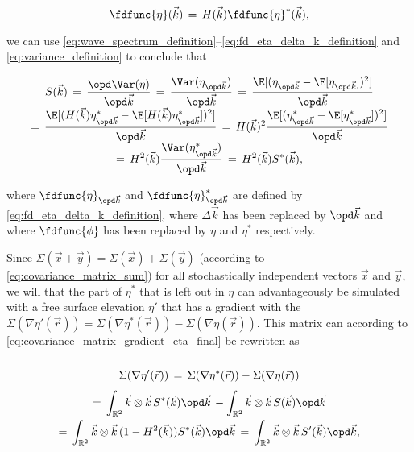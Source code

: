 {\begin{equation}
\fdfunc{\eta}(\vec{k}) \,=\, H(\vec{k})\fdfunc{\eta}^*(\vec{k}),
\end{equation}

we can use  \ref{eq:wave_spectrum_definition}--\ref{eq:fd_eta_delta_k_definition} and \eqref{eq:variance_definition} to conclude that

\begin{equation} \label{spectrum_reduced_definition}
\renewcommand*{\arraystretch}{2}
\begin{array}{c}
\displaystyle S(\vec{k}) \,=\, \frac{\opd \Var(\eta)}{\opd\vec{k}} \,=\, \frac{\Var(\eta_{\opd\vec{k}})}{\opd\vec{k}} \,=\, \frac{\E[(\eta_{\opd\vec{k}}-\E[\eta_{\opd\vec{k}}])^2]}{\opd\vec{k}} \\
\displaystyle =\, \frac{\E[(H(\vec{k})\eta^*_{\opd\vec{k}}-\E[H(\vec{k})\eta^*_{\opd\vec{k}}])^2]}{\opd\vec{k}} \,=\, H(\vec{k})^2\frac{\E[(\eta^*_{\opd\vec{k}}-\E[\eta^*_{\opd\vec{k}}])^2]}{\opd\vec{k}} \\
\displaystyle =\, H^2(\vec{k})\frac{\Var(\eta^*_{\opd\vec{k}})}{\opd\vec{k}} \,=\, H^2(\vec{k})S^*(\vec{k}),
\end{array}
\end{equation}

where $\fdfunc{\eta}_{\opd\vec{k}}$ and $\fdfunc{\eta}^*_{\opd\vec{k}}$ are defined by \eqref{eq:fd_eta_delta_k_definition}, where $\Delta\vec{k}$ has been replaced by $\opd\vec{k}$ and where $\fdfunc{\phi}$ has been replaced by $\eta$ and $\eta^*$ respectively.

Since $\Sigma(\vec{x}+\vec{y}) = \Sigma(\vec{x})+\Sigma(\vec{y})$ (according to \eqref{eq:covariance_matrix_sum}) for all stochastically independent vectors $\vec{x}$ and $\vec{y}$, we will \assume that the part of $\eta^*$ that is left out in $\eta$ can advantageously be simulated with a free surface elevation $\eta'$ that has a gradient with the  $\Sigma(\nabla\eta'(\vec{r})) = \Sigma(\nabla\eta^*(\vec{r})) - \Sigma(\nabla\eta(\vec{r}))$. This matrix can according to  \eqref{eq:covariance_matrix_gradient_eta_final} be rewritten as

\begin{equation}
\renewcommand*{\arraystretch}{2}
\begin{array}{c}
\displaystyle \Sigma(\nabla\eta'(\vec{r})) \,=\, \Sigma(\nabla\eta^*(\vec{r})) - \Sigma(\nabla\eta(\vec{r})) \\
\displaystyle =\, \int_{\mathbb{R}^2}\vec{k}\otimes\vec{k}\,S^*(\vec{k})\opd\vec{k} \,- \int_{\mathbb{R}^2}\vec{k}\otimes\vec{k}\,S(\vec{k})\opd\vec{k} \\
\displaystyle =\, \int_{\mathbb{R}^2}\vec{k}\otimes\vec{k}\,(1-H^2(\vec{k}))S^*(\vec{k})\opd\vec{k} \,=\, \int_{\mathbb{R}^2}\vec{k}\otimes\vec{k}\,S'(\vec{k})\opd\vec{k},
\end{array}
\end{equation}

}

